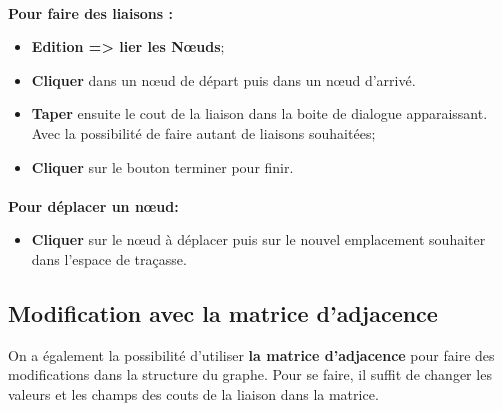 \documentclass[11pt,twoside,a4paper]{article}
\begin{document}
\paragraph{}
{\bf Pour faire des liaisons :}
\begin{itemize}
	\item \textbf{Edition => lier les Nœuds};
	\item \textbf{Cliquer} dans un nœud de départ puis dans un nœud d’arrivé.
	\item \textbf{Taper} ensuite le cout de la liaison dans la boite de dialogue apparaissant. Avec la possibilité de faire autant de liaisons souhaitées; 
	\item \textbf{Cliquer} sur le bouton terminer pour finir.
\end{itemize}
\paragraph{}
{\bf Pour déplacer un nœud:}
\begin{itemize}
	\item \textbf{Cliquer} sur le nœud à déplacer puis sur le nouvel emplacement souhaiter dans l’espace de traçasse.
\end{itemize}

\subsection{Modification avec la matrice d’adjacence}
On a également la possibilité d’utiliser \textbf{la matrice d’adjacence} pour faire des modifications dans la structure du graphe. Pour se faire, il suffit de changer les valeurs et les champs des couts de la liaison dans la matrice.
\end{document}
